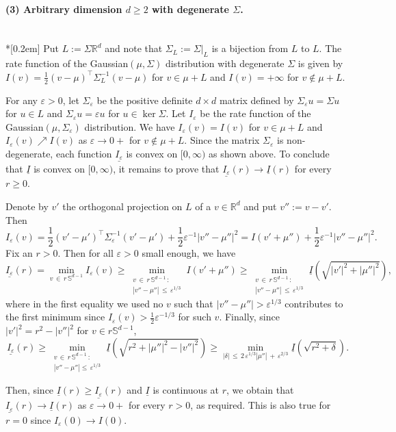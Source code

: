 \documentclass[10pt]{amsart}
\theoremstyle{definition}\newtheorem{defi}[theo]{Definition}\newtheorem{rema}[theo]{Remark}\newtheorem{exam}[theo]{Example}\newtheorem{exem}[theo]{Example}\newtheorem{nota}[theo]{Notation}
\newcommand{\ubar}[1]{\underline{#1}}
\newcommand{\Rbb}{\mathbb{R}}
\newcommand{\Sbb}{\mathbb{S}}
\begin{document}
\begin{proofc}
\paragraph{(3) Arbitrary dimension $d \ge 2$ with degenerate $\Sigma$.}\ \\*[0.2em]
Put $L:=\Sigma \Rbb^d$ and note that $\Sigma_L:={\Sigma|}_L$ is a bijection from $L$ to $L$. The rate function of the Gaussian$(\mu, \Sigma)$ distribution with degenerate $\Sigma$ is given by $I(v)=\frac12 (v-\mu)^\top \Sigma_L^{-1}(v-\mu)$ for $v \in \mu + L$ and $I(v)=+\infty$ for $v \not \in \mu + L$.

For any $\varepsilon >0$, let $\Sigma_\varepsilon$ be the positive definite $d \times d$ matrix defined by $\Sigma_\varepsilon u = \Sigma u$ for $u \in L$ and $\Sigma_\varepsilon u=\varepsilon u$ for $u \in \ker \Sigma$. Let $I_\varepsilon$ be the rate function of the Gaussian$(\mu, \Sigma_\varepsilon)$ distribution. We have $I_\varepsilon(v)=I(v)$ for $v \in \mu +L$ and $I_\varepsilon(v) \nearrow I(v)$ as $\varepsilon \to 0+$ for $v \not \in \mu +L$. Since the matrix $\Sigma_\varepsilon$ is non-degenerate, each function $\ubar{I_\varepsilon}$ is convex on $[0, \infty)$ as shown above. To conclude that $\ubar I$ is convex on $[0, \infty)$, it remains to prove that $\ubar{I_\varepsilon}(r) \to \ubar I(r)$ for every $r \ge 0$.


Denote by $v'$ the orthogonal projection on $L$ of a $v \in \Rbb^d$ and put $v'':=v-v'$. Then
\[
I_\varepsilon(v)=\frac12 (v'-\mu')^\top \Sigma_\varepsilon^{-1}(v'-\mu') + \frac12 \varepsilon^{-1} \left|v'' - \mu''\right|^2 = I(v'+\mu'') + \frac12 \varepsilon^{-1} \left|v'' - \mu''\right|^2.
\]
Fix an $r > 0$. Then for all $\varepsilon >0$ small enough, we have
\[
\ubar{I_\varepsilon}(r) = \min_{v\,\in\,r\,\Sbb^{d-1} } I_\varepsilon(v) \ge \min_{\substack{v\,\in\,r\,\Sbb^{d-1}\,: \\
\left|v'' - \mu''\right|\,\le\,\varepsilon^{1/3}}} I(v'+\mu'') \ge \min_{\substack{v\,\in\,r\,\Sbb^{d-1}\,: \\
\left|v'' - \mu''\right|\,\le\,\varepsilon^{1/3}}} \ubar I \left(\sqrt{|v'|^2+|\mu''|^2} \right),
\]
where in the first equality we used no $v$ such that $|v'' - \mu''| > \varepsilon^{1/3}$ contributes to the first minimum since $I_\varepsilon(v)>\frac12 \varepsilon^{-1/3}$ for such $v$. Finally, since $|v'|^2=r^2 - |v''|^2$ for $v \in r \Sbb^{d-1}$,
\[
\ubar{I_\varepsilon}(r) \ge \min_{\substack{v\,\in\,r\, \Sbb^{d-1}\,: \\
\left|v'' - \mu''\right|\le\,\varepsilon^{1/3}} } \ubar I \left(\sqrt{r^2+|\mu''|^2-|v''|^2} \right) \ge \min_{|\delta|\,\le\,2\,\varepsilon^{1/3} |\mu''|\,+\,\varepsilon^{2/3} } \ubar I \left(\sqrt{r^2+\delta} \right).
\]

Then, since $\ubar I(r) \ge \ubar{I_\varepsilon}(r) $ and $\ubar I$ is continuous at $r$, we obtain that $\ubar{I_\varepsilon}(r) \to \ubar I(r)$ as $\varepsilon \to 0+$ for every $r>0$, as required. This is also true for $r=0$ since $I_\varepsilon(0) \to I(0)$.\qedhere
\end{proofc}
\end{document}
